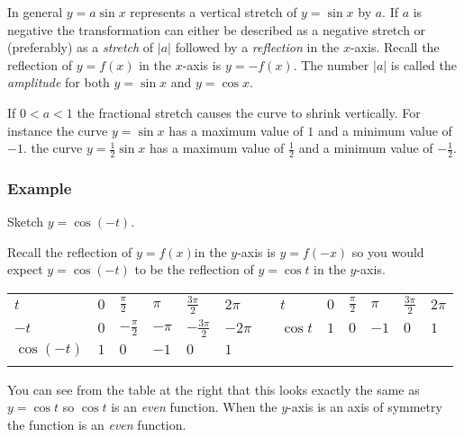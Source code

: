 \setlength\fboxrule{0.01in}\setlength\fboxsep{0.2in}


In general $y =a \sin  x$ represents a vertical stretch of $y =\sin  x$ by $a$. If $a$ is negative the transformation can either be described as a negative stretch or (preferably) as a \emph{stretch}
of $\left \vert a\right \vert $ followed by a \emph{reflection} in the $x$-axis. Recall the reflection of $y =f \left (x\right )$ in the $x$-axis is $y = -f \left (x\right )$. The number $\left \vert a\right \vert $ is called the \emph{amplitude} for both $y =\sin  x$ and $y =\cos  x\text{.}$ 

If $0 <a <1$ the fractional stretch causes the curve to shrink vertically. For instance the curve
$y =\sin  x$ has a maximum value of $1$ and a minimum value of $ -1$. the curve $y =\frac{1}{2} \sin  x$ has a maximum value of $\frac{1}{2}$ and a minimum value of $ -\frac{1}{2}$. 

\subsubsection{Example}
Sketch $y =\cos  ( -t)\text{.}$ 

Recall the reflection of $y =f (x)$in the $y$-axis is $y =f ( -x)$ so you would expect $y =\cos  ( -t)$ to be the reflection of $y =\cos  t$ in the $y$-axis. 


\begin{tabular}[c]{|l|l|l|l|l|l||l|l|l|l|l|l|l}
	$t$  & $0$  & $\frac{\pi }{2}$  & $\pi $  & $\frac{3 \pi }{2}$  & $2 \pi $  &  & $t$  & $0$  & $\frac{\pi }{2}$  & $\pi $  & $\frac{3 \pi }{2}$  & $2 \pi $  \\
	$ -t$  & $0$  & $ -\frac{\pi }{2}$  & $ -\pi $  & $ -\frac{3 \pi }{2}$  & $ -2 \pi $  &  & $\cos  t$  & $1$  & $0$  & $ -1$  & $0$  & $1$  \\
	$\cos  \left ( -t\right )$  & $1$  & $0$  & $ -1$  & $0$  & $1$  &  &  &  &  &  &  &  \\
	\multicolumn{1}{|l}{
	}
\end{tabular}

You can see from the table at the right that this looks exactly the same as
$y =\cos  t$ so $\cos  t$ is an \emph{even} function. When the $y$-axis is an axis of symmetry the function is an \emph{even} function. 


\setlength\fboxrule{0.01in}\setlength\fboxsep{0.2in}


